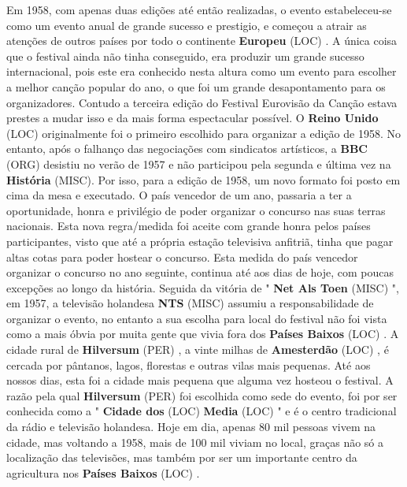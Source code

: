 \documentclass[12pt,a4paper]{article}
\begin{document}
Em 1958, com apenas duas edições até então realizadas, o evento estabeleceu-se como um evento anual de grande sucesso e prestigio, e começou a atrair as atenções de outros países por todo o continente \textbf{Europeu} (LOC) . A única coisa que o festival ainda não tinha conseguido, era produzir um grande sucesso internacional, pois este era conhecido nesta altura como um evento para escolher a melhor canção popular do ano, o que foi um grande desapontamento para os organizadores. Contudo a terceira edição do Festival Eurovisão da Canção estava prestes a mudar isso e da mais forma espectacular possível. O \textbf{Reino Unido} (LOC) originalmente foi o primeiro escolhido para organizar a edição de 1958. No entanto, após o falhanço das negociações com sindicatos artísticos, a \textbf{BBC} (ORG) desistiu no verão de 1957 e não participou pela segunda e última vez na \textbf{História} (MISC). Por isso, para a edição de 1958, um novo formato foi posto em cima da mesa e executado. O país vencedor de um ano, passaria a ter a oportunidade, honra e privilégio de poder organizar o concurso nas suas terras nacionais. Esta nova regra/medida foi aceite com grande honra pelos países participantes, visto que até a própria estação televisiva anfitriã, tinha que pagar altas cotas para poder hostear o concurso. Esta medida do país vencedor organizar o concurso no ano seguinte, continua até aos dias de hoje, com poucas excepções ao longo da história. Seguida da vitória de " \textbf{Net Als Toen} (MISC) ", em 1957, a televisão holandesa \textbf{NTS} (MISC) assumiu a responsabilidade de organizar o evento, no entanto a sua escolha para local do festival não foi vista como a mais óbvia por muita gente que vivia fora dos \textbf{Países Baixos} (LOC) . A cidade rural de \textbf{Hilversum} (PER) , a vinte milhas de \textbf{Amesterdão} (LOC) , é cercada por pântanos, lagos, florestas e outras vilas mais pequenas. Até aos nossos dias, esta foi a cidade mais pequena que alguma vez hosteou o festival. A razão pela qual \textbf{Hilversum} (PER) foi escolhida como sede do evento, foi por ser conhecida como a " \textbf{Cidade dos} (LOC) \textbf{Media} (LOC) " e é o centro tradicional da rádio e televisão holandesa. Hoje em dia, apenas 80 mil pessoas vivem na cidade, mas voltando a 1958, mais de 100 mil viviam no local, graças não só a localização das televisões, mas também por ser um importante centro da agricultura nos \textbf{Países Baixos} (LOC) .
\end{document}

